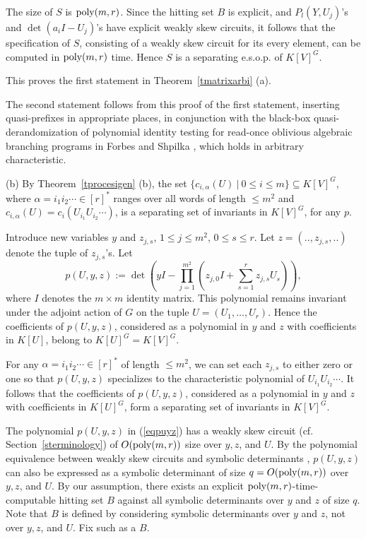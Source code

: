 \documentclass[11pt]{article}
\begin{document}
The size of $S$ is   ${\mbox {poly}}(m,r)$.
Since the hitting set $B$ is explicit,
and $P_l(Y,U_j)$'s and $\det(a_i I - U_j)$'s
have explicit   weakly skew circuits,
it follows that the specification of $S$, consisting of a 
weakly skew circuit  for its every element, can be computed in ${\mbox {poly}}(m,r)$ time. 
Hence $S$ is  a separating  e.s.o.p. of $K[V]^G$.

This proves  the first statement in Theorem~\ref{tmatrixarbi} (a).

The second statement  follows from this proof of the first statement, 
inserting quasi-prefixes in appropriate places, in conjunction with 
the black-box quasi-derandomization of polynomial identity testing for
read-once oblivious algebraic branching programs in Forbes and Shpilka \cite{fs2}, 
which  holds in arbitrary characteristic.

\noindent (b) 
By Theorem~\ref{tprocesigen} (b), the set 
$\{c_{i,\alpha}(U) \ | \ 0 \le i \le m\} \subseteq K[V]^G$, where
$\alpha=i_1 i_2 \cdots \in [r]^*$ ranges over all words of length $\le m^2$
and $c_{i,\alpha}(U)=c_i(U_{i_1} U_{i_2} \cdots)$, 
is a  separating set of invariants in $K[V]^G$, for any  $p$.


Introduce new variables $y$ and $z_{j,s}$, $1 \le j \le m^2$, $0 \le s \le r$.
Let $z=(..,z_{j,s},..)$ denote the tuple of $z_{j,s}$'s. 
Let 
\begin{equation} \label{eqpuyz}
p(U,y,z):= \det(y I-\prod_{j=1}^{m^2} (z_{j,0} I + \sum_{s=1}^r z_{j,s} U_s)),
\end{equation}
where $I$ denotes the $m \times m$ identity matrix. This polynomial remains invariant under the
adjoint action of $G$ on the tuple $U=(U_1,\ldots,U_r)$.
Hence  the coefficients of $p(U,y,z)$, considered as a polynomial in $y$ and $z$ with coefficients
in $K[U]$, belong to  $K[U]^G=K[V]^G$.

For any $\alpha=i_1 i_2 \cdots \in [r]^*$ of length $\le m^2$, we can set each $z_{j,s}$ to either zero or one
so that $p(U,y,z)$ specializes to the characteristic polynomial of $U_{i_1} U_{i_2} \cdots$.
It follows that the coefficients of $p(U,y,z)$, considered as a polynomial in $y$ and $z$ with
coefficients in $K[U]^G$, form a separating set of invariants in  $K[V]^G$. 

The polynomial $p(U,y,z)$ in (\ref{eqpuyz}) has a weakly skew circuit (cf. Section~\ref{sterminology})
of  $O({\mbox {poly}}(m,r))$ size over $y,z$, and $U$. 
By the polynomial equivalence between weakly skew circuits
and symbolic determinants \cite{malod},  $p(U,y,z)$
can also be expressed as a symbolic determinant
of size $q=O({\mbox {poly}}(m,r))$ over $y,z$, and $U$. 
By our assumption, there exists an explicit
${\mbox {poly}}(m,r)$-time-computable hitting set $B$ against all symbolic determinants over $y$ and $z$ of size $q$. Note that  $B$ is defined by
considering  symbolic determinants over $y$ and $z$,
not over $y,z$, and $U$. Fix such as a $B$. 
\end{document}
